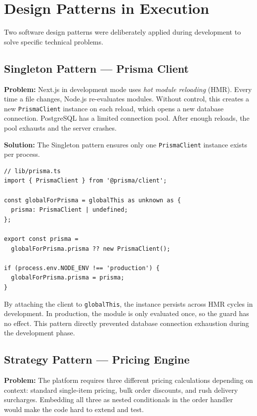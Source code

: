 \documentclass[12pt,a4paper]{report}
\begin{document}
\section{Design Patterns in Execution}

Two software design patterns were deliberately applied during development to solve specific technical problems.

\subsection{Singleton Pattern --- Prisma Client}

\textbf{Problem:} Next.js in development mode uses \textit{hot module reloading} (HMR). Every time a file changes, Node.js re-evaluates modules. Without control, this creates a new \texttt{PrismaClient} instance on each reload, which opens a new database connection. PostgreSQL has a limited connection pool. After enough reloads, the pool exhausts and the server crashes.

\textbf{Solution:} The Singleton pattern ensures only one \texttt{PrismaClient} instance exists per process.

\begin{verbatim}
// lib/prisma.ts
import { PrismaClient } from '@prisma/client';

const globalForPrisma = globalThis as unknown as {
  prisma: PrismaClient | undefined;
};

export const prisma =
  globalForPrisma.prisma ?? new PrismaClient();

if (process.env.NODE_ENV !== 'production') {
  globalForPrisma.prisma = prisma;
}
\end{verbatim}

By attaching the client to \texttt{globalThis}, the instance persists across HMR cycles in development. In production, the module is only evaluated once, so the guard has no effect. This pattern directly prevented database connection exhaustion during the development phase.

\subsection{Strategy Pattern --- Pricing Engine}

\textbf{Problem:} The platform requires three different pricing calculations depending on context: standard single-item pricing, bulk order discounts, and rush delivery surcharges. Embedding all three as nested conditionals in the order handler would make the code hard to extend and test.
\end{document}
